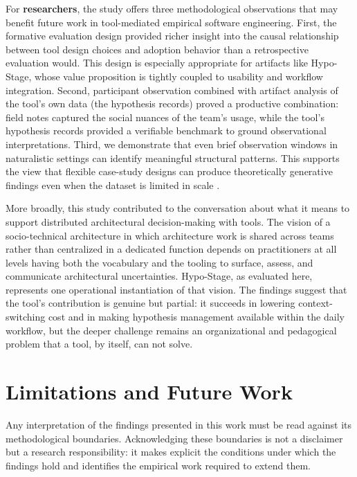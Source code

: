 For \textbf{researchers}, the study offers three methodological observations that may
benefit future work in tool-mediated empirical software engineering. First, the
formative evaluation design provided richer insight into the causal relationship between tool design choices and adoption
behavior than a retrospective evaluation would. This design is especially appropriate
for artifacts like Hypo-Stage, whose value proposition is tightly coupled to usability
and workflow integration. Second, participant observation combined with artifact
analysis of the tool's own data (the hypothesis records) proved a productive combination:
field notes captured the social nuances of the team's usage, while the tool’s hypothesis records provided a 
verifiable benchmark to ground observational interpretations. Third, we demonstrate that even brief observation windows 
in naturalistic settings can identify meaningful structural patterns. This supports the view that flexible case-study designs can produce theoretically
generative findings even when the dataset is limited in scale \citep{robson2016}.

More broadly, this study contributed to the conversation about what it means to
support distributed architectural decision-making with tools. The vision of a
socio-technical architecture \citep{infoq2024trends, infoq2025empowering, infoq2025decentralized} in which
architecture work is shared across teams rather than centralized in a dedicated function
depends on practitioners at all levels having both the vocabulary and the tooling to
surface, assess, and communicate architectural uncertainties. Hypo-Stage, as evaluated
here, represents one operational instantiation of that vision. The findings suggest
that the tool's contribution is genuine but partial: it succeeds in lowering
context-switching cost and in making hypothesis management available within the daily
workflow, but the deeper challenge remains an organizational and 
pedagogical problem that a tool, by itself, can not solve.

\section{Limitations and Future Work}
\label{sec:future-work}
\label{sec:conclusion-limitations}

Any interpretation of the findings presented in this work must be read against
its methodological boundaries. Acknowledging these boundaries is not a disclaimer but
a research responsibility: it makes explicit the conditions under which the findings hold
and identifies the empirical work required to extend them.

